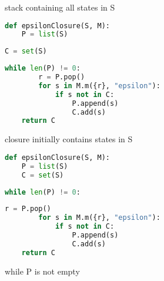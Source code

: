 \documentclass[8pt,a4paper,compress]{beamer}
\begin{document}
\begin{frame}[fragile]
\begin{overprint}
\begin{tcolorbox}[enhanced,drop shadow southwest,sharp corners,size=fbox,colback=white,fontlower=\small\ttfamily,collower=silver900]
\tcblower
\begin{minipage}[t][.25cm][t]{\textwidth}
stack containing all states in S
\end{minipage}
\end{tcolorbox}

\begin{tcolorbox}[enhanced,drop shadow southwest,sharp corners,size=fbox,colback=white,fontlower=\small\ttfamily,collower=silver900]

\begin{lstlisting}[language=Python,style=focusout]
def epsilonClosure(S, M):
    P = list(S)
\end{lstlisting}
\begin{lstlisting}[language=Python,style=focusin,backgroundcolor=\color{lime100}]
    C = set(S)
\end{lstlisting}
\begin{lstlisting}[language=Python,style=focusout]
    while len(P) != 0:
        r = P.pop()
        for s in M.m({r}, "epsilon"):
            if s not in C:
                P.append(s)
                C.add(s)
    return C
\end{lstlisting}

\tcblower
\begin{minipage}[t][.25cm][t]{\textwidth}
closure initially contains states in S
\end{minipage}
\end{tcolorbox}

\begin{tcolorbox}[enhanced,drop shadow southwest,sharp corners,size=fbox,colback=white,fontlower=\small\ttfamily,collower=silver900]

\begin{lstlisting}[language=Python,style=focusout]
def epsilonClosure(S, M):
    P = list(S)
    C = set(S)
\end{lstlisting}
\begin{lstlisting}[language=Python,style=focusin,backgroundcolor=\color{lime100}]
    while len(P) != 0:
\end{lstlisting}
\begin{lstlisting}[language=Python,style=focusout]
        r = P.pop()
        for s in M.m({r}, "epsilon"):
            if s not in C:
                P.append(s)
                C.add(s)
    return C
\end{lstlisting}

\tcblower
\begin{minipage}[t][.25cm][t]{\textwidth}
while P is not empty
\end{minipage}
\end{tcolorbox}


\end{overprint}
\end{frame}
\end{document}
